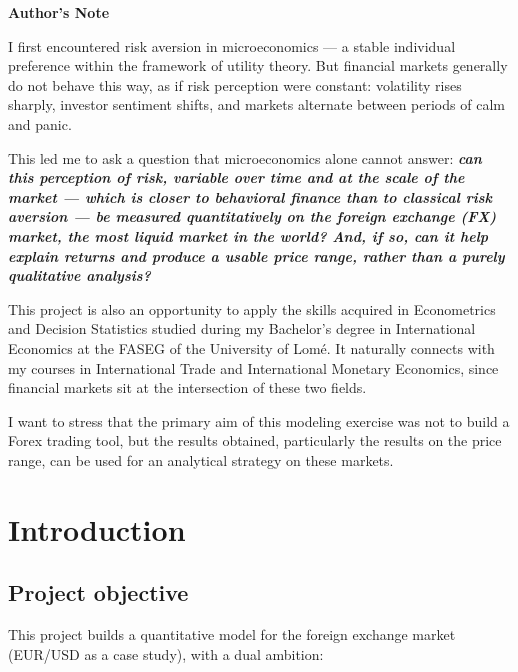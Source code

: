 \documentclass[12pt,a4paper]{article}
\begin{document}
\tableofcontents
\newpage

\begin{center}
	{\LARGE\bfseries Author's Note}
\end{center}
\vspace{0.8cm}

I first encountered risk aversion in microeconomics --- a stable individual preference within the framework of utility theory. But financial markets generally do not behave this way, as if risk perception were constant: volatility rises sharply, investor sentiment shifts, and markets alternate between periods of calm and panic.

This led me to ask a question that microeconomics alone cannot answer: \textit{\textbf{can this perception of risk, variable over time and at the scale of the market — which is closer to behavioral finance than to classical risk aversion — be measured quantitatively on the foreign exchange (FX) market, the most liquid market in the world? And, if so, can it help explain returns and produce a usable price range, rather than a purely qualitative analysis?}}

This project is also an opportunity to apply the skills acquired in Econometrics and Decision Statistics studied during my Bachelor's degree in International Economics at the FASEG of the University of Lomé.
It naturally connects with my courses in International Trade and International Monetary Economics, since financial markets sit at the intersection of these two fields.

I want to stress that the primary aim of this modeling exercise was not to build a Forex trading tool, but the results obtained, particularly the results on the price range, can be used for an analytical strategy on these markets.

\newpage
\section{Introduction}
\label{sec:intro}

\subsection{Project objective}

This project builds a quantitative model for the foreign exchange market
(EUR/USD as a case study), with a dual ambition:
\end{document}
